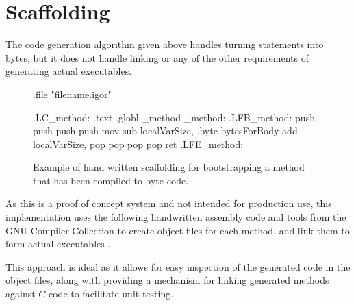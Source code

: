     \section{Scaffolding}

    The code generation algorithm given above handles turning statements into
    bytes, but it does not handle linking or any of the other requirements of
    generating actual executables.

    \begin{figure}
        \begin{vcode}
    .file "filename.igor"
    
    .LC_method:
        .text
        .globl    _method
    _method:
    .LFB_method:
        push    %
        push    %
        push    %
        push    %
        mov    %
        sub    localVarSize, %
        .byte  bytesForBody
        add    localVarSize, %
        pop    %
        pop    %
        pop    %
        pop    %
        ret
    .LFE_method:
        \end{vcode}
        \caption[Example of hand written scaffolding.]{Example of hand written scaffolding for bootstrapping a method
        that has been compiled to byte code.}
        \label{tab:method-statements}
    \end{figure}

    As this is a proof of concept system and not intended for production use,
    this implementation uses the following handwritten assembly code and tools
    from the GNU Compiler Collection to create object files for each method, and
    link them to form actual executables \cite{gcc}.

    This approach is ideal as it allows for easy inspection of the generated
    code in the object files, along with providing a mechanism for linking
    generated methods against $C$ code to facilitate unit testing.

